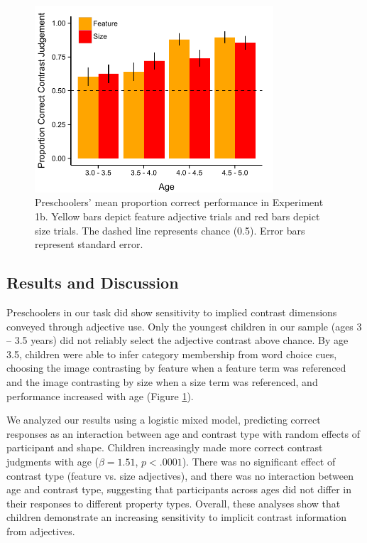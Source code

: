\documentclass[10pt,letterpaper]{article}
\begin{document}
\begin{figure}[t] 
  \begin{center} 
    \includegraphics[width=3.5in]{figures/experiment1bResults.pdf} 
    \caption{\label{fig:kids1} Preschoolers' mean proportion correct performance in Experiment 1b. Yellow bars depict feature adjective trials and red bars depict size trials. The dashed line represents chance (0.5). Error bars represent standard error.}
  \end{center} 
\end{figure}	




\subsection{Results and Discussion}

Preschoolers in our task did show sensitivity to implied contrast dimensions conveyed through adjective use.  Only the youngest children in our sample (ages 3 -- 3.5 years) did not reliably select the adjective contrast above chance.  By age 3.5, children were able to infer category membership from word choice cues, choosing the image contrasting by feature when a feature term was referenced and the image contrasting by size when a size term was referenced, and performance increased with age (Figure \ref{fig:kids1}).


We analyzed our results using a logistic mixed model, predicting correct responses as an interaction between age and contrast type with random effects of participant and shape.  Children increasingly made more correct contrast judgments with age ($\beta = 1.51$, $p < .0001$).
  There was no significant effect of contrast type (feature vs. size adjectives), and there was no interaction between age and contrast type, suggesting that participants across ages did not differ in their responses to different property types.  Overall, these analyses show that children demonstrate an increasing sensitivity to implicit contrast information from adjectives.  
\end{document}
